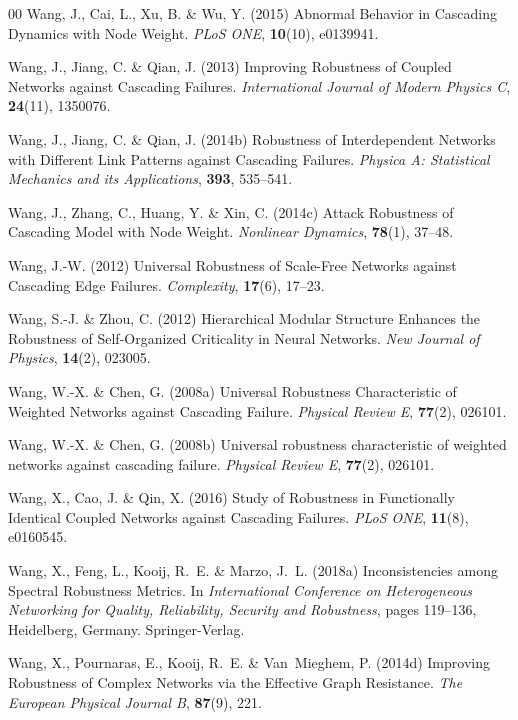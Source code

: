 \documentclass{comnet-mod}
\begin{document}
\begin{thebibliography}{00}
Wang, J., Cai, L., Xu, B. {\&} Wu, Y. (2015)  {Abnormal Behavior in Cascading
  Dynamics with Node Weight}. {\em {PLoS ONE}}, \textbf{10}(10), e0139941.

Wang, J., Jiang, C. {\&} Qian, J. (2013)  {Improving Robustness of Coupled
  Networks against Cascading Failures}. {\em {International Journal of Modern
  Physics C}}, \textbf{24}(11), 1350076.

Wang, J., Jiang, C. {\&} Qian, J. (2014b)  {Robustness of Interdependent
  Networks with Different Link Patterns against Cascading Failures}. {\em
  {Physica A: Statistical Mechanics and its Applications}}, \textbf{393},
  535--541.

Wang, J., Zhang, C., Huang, Y. {\&} Xin, C. (2014c)  {Attack Robustness of
  Cascading Model with Node Weight}. {\em {Nonlinear Dynamics}},
  \textbf{78}(1), 37--48.

Wang, J.-W. (2012)  {Universal Robustness of Scale-Free Networks against
  Cascading Edge Failures}. {\em {Complexity}}, \textbf{17}(6), 17--23.

Wang, S.-J. {\&} Zhou, C. (2012)  {Hierarchical Modular Structure Enhances the
  Robustness of Self-Organized Criticality in Neural Networks}. {\em {New
  Journal of Physics}}, \textbf{14}(2), 023005.

Wang, W.-X. {\&} Chen, G. (2008a)  {Universal Robustness Characteristic of
  Weighted Networks against Cascading Failure}. {\em {Physical Review E}},
  \textbf{77}(2), 026101.

Wang, W.-X. {\&} Chen, G. (2008b)  Universal robustness characteristic of
  weighted networks against cascading failure. {\em {Physical Review E}},
  \textbf{77}(2), 026101.

Wang, X., Cao, J. {\&} Qin, X. (2016)  {Study of Robustness in Functionally
  Identical Coupled Networks against Cascading Failures}. {\em {PLoS ONE}},
  \textbf{11}(8), e0160545.

Wang, X., Feng, L., Kooij, R.~E. {\&} Marzo, J.~L. (2018a)  {Inconsistencies
  among Spectral Robustness Metrics}. In {\em {International Conference on
  Heterogeneous Networking for Quality, Reliability, Security and Robustness}},
  pages 119--136, Heidelberg, Germany. {Springer-Verlag}.

Wang, X., Pournaras, E., Kooij, R.~E. {\&} Van~Mieghem, P. (2014d)  {Improving
  Robustness of Complex Networks via the Effective Graph Resistance}. {\em {The
  European Physical Journal B}}, \textbf{87}(9), 221.


\end{thebibliography}
\end{document}
